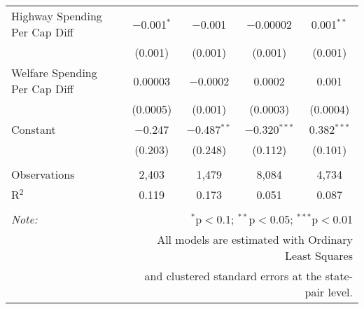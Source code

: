 \begin{table}[!htbp]
\begin{tabular}{@{\extracolsep{5pt}}lcccc}
  Highway Spending Per Cap Diff & $-$0.001$^{*}$ & $-$0.001 & $-$0.00002 & 0.001$^{**}$ \\ 
  & (0.001) & (0.001) & (0.001) & (0.001) \\ 
  Welfare Spending Per Cap Diff & 0.00003 & $-$0.0002 & 0.0002 & 0.001 \\ 
  & (0.0005) & (0.001) & (0.0003) & (0.0004) \\ 
  Constant & $-$0.247 & $-$0.487$^{**}$ & $-$0.320$^{***}$ & 0.382$^{***}$ \\ 
  & (0.203) & (0.248) & (0.112) & (0.101) \\ 
 \hline \\[-1.8ex] 
Observations & 2,403 & 1,479 & 8,084 & 4,734 \\ 
R$^{2}$ & 0.119 & 0.173 & 0.051 & 0.087 \\ 
\hline 
\hline \\[-1.8ex] 
\textit{Note:}  & \multicolumn{4}{r}{$^{*}$p$<$0.1; $^{**}$p$<$0.05; $^{***}$p$<$0.01} \\ 
 & \multicolumn{4}{r}{All models are estimated with Ordinary Least Squares} \\ 
 & \multicolumn{4}{r}{and clustered standard errors at the state-pair level.} \\ 
\end{tabular} 
\end{table} 
